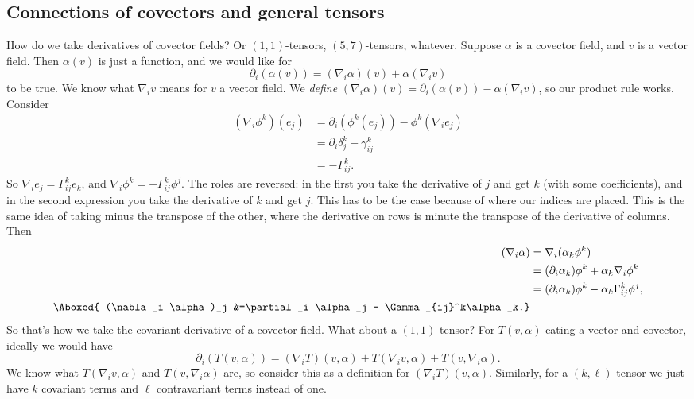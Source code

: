 \subsection{Connections of covectors and general tensors}
How do we take derivatives of covector fields? Or $(1,1)$-tensors, $(5,7)$-tensors, whatever. Suppose $\alpha $ is a covector field, and $v$ is a vector field. Then $\alpha (v)$ is just a function, and we would like for \[
    \partial _i (\alpha (v))=(\nabla _i \alpha )(v)+\alpha (\nabla_i v)
\] to be true. We know what $\nabla_i v$ means for $v$ a vector field. We \emph{define} $(\nabla_i \alpha )(v)=\partial _i (\alpha (v))-\alpha (\nabla_i v)$, so our product rule works. Consider 
\begin{align*}
    (\nabla _i  \phi^k)(e_j )&= \partial _i (\phi^k(e_j ))-\phi^k(\nabla _i e_j )\\
                             &=\partial _i \delta_j ^k- \gamma _{ij}^k\\
                             &=-\Gamma _{ij}^k.
\end{align*}
So $\nabla _i e_j =\Gamma _{ij}^k e_k$, and $\nabla _i \phi^k =-\Gamma _{ij}^k \phi^j $. The roles are reversed: in the first you take the derivative of $j$ and get $k$ (with some coefficients), and in the second expression you take the derivative of $k$ and get $j$. This has to be the case because of where our indices are placed. This is the same idea of taking minus the transpose of the other, where the derivative on rows is minute the transpose of the derivative of columns. Then 
\begin{align*}
    (\nabla _i \alpha )&=\nabla _i (\alpha _k\phi^k)\\
                       &=(\partial _i \alpha _k)\phi^k+\alpha _k\nabla _i \phi^k\\
                       &= (\partial _i \alpha _k)\phi^k - \alpha _k \Gamma _{ij}^k \phi^j ,\\
    \Aboxed{ (\nabla _i \alpha )_j &=\partial _i \alpha _j - \Gamma _{ij}^k\alpha _k.}
\end{align*}So that's how we take the covariant derivative of a covector field. What about a $(1,1)$-tensor? For $T(v,\alpha )$ eating a vector and covector, ideally we would have \[
\partial _i (T(v,\alpha ))=(\nabla _i T)(v,\alpha )+T(\nabla _i v,\alpha )+T(v,\nabla _i \alpha ).
\] We know what $T(\nabla _i v,\alpha )$ and $T(v,\nabla _i \alpha )$ are, so consider this as a definition for $(\nabla _i T)(v,\alpha )$. Similarly, for a $(k,\ell)$-tensor we just have $k$ covariant terms and $\ell$ contravariant terms instead of one.


